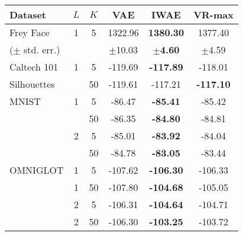 
\centering
{}
\label{tab:vae_ll}
\begin{tabular}{lccccc}
\toprule
\bf{Dataset}&$L$&$K$&\bf{ VAE }&\bf{ IWAE }&\bf{ VR-max }\\
\hline
Frey Face&1&5&1322.96&\bf{1380.30}&1377.40\\
($\pm$ std. err.)& & &$\pm$10.03&\bf{$\pm$4.60}&$\pm$4.59 \\
\hline
Caltech 101& 1& 5&-119.69&\bf{-117.89}&-118.01\\
Silhouettes&  &50&-119.61&-117.21&\bf{-117.10}\\
\hline
MNIST& 1&5 &-86.47&\bf{-85.41}&-85.42\\
     &  &50&-86.35&\bf{-84.80}&-84.81\\
     & 2&5 &-85.01&\bf{-83.92}&-84.04\\
     &  &50&-84.78&\bf{-83.05}&-83.44\\
\hline
OMNIGLOT & 1&5 &-107.62&\bf{-106.30}&-106.33\\
		 & 1&50&-107.80&\bf{-104.68}&-105.05\\
		 & 2&5 &-106.31&\bf{-104.64}&-104.71\\
		 & 2&50&-106.30&\bf{-103.25}&-103.72\\
\bottomrule
\end{tabular}
